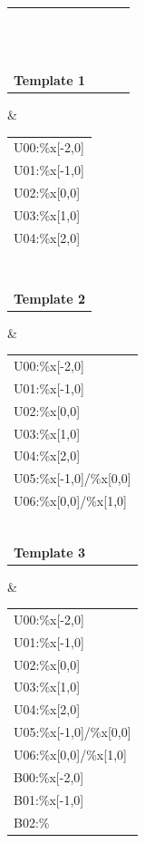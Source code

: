 \documentclass[a4paper,8pt,oneside]{article}
\begin{document}
			\begin{table}[h]
				\begin{tabular}{llll}
					\begin{tabular}[c]{@{}l@{}}U02:\%x{[}0,0{]}\\ \\ \\ \\ \\ \\ \\ \\ \\ \\ \\ \\ \\ \textbf{Template 1}\end{tabular} & \begin{tabular}[c]{@{}l@{}}U00:\%x{[}-2,0{]}\\ U01:\%x{[}-1,0{]}\\ U02:\%x{[}0,0{]}\\ U03:\%x{[}1,0{]}\\ U04:\%x{[}2,0{]}\\ \\ \\ \\ \\ \\ \\ \\ \\ \textbf{Template 2}\end{tabular} & \begin{tabular}[c]{@{}l@{}}U00:\%x{[}-2,0{]}\\ U01:\%x{[}-1,0{]}\\ U02:\%x{[}0,0{]}\\ U03:\%x{[}1,0{]}\\ U04:\%x{[}2,0{]}\\ U05:\%x{[}-1,0{]}/\%x{[}0,0{]}\\ U06:\%x{[}0,0{]}/\%x{[}1,0{]}\\ \\ \\ \\ \\        \\ \\ \textbf{Template 3}\end{tabular} & \begin{tabular}[c]{@{}l@{}}U00:\%x{[}-2,0{]}\\ U01:\%x{[}-1,0{]}\\ U02:\%x{[}0,0{]}\\ U03:\%x{[}1,0{]}\\ U04:\%x{[}2,0{]}\\ U05:\%x{[}-1,0{]}/\%x{[}0,0{]}\\ U06:\%x{[}0,0{]}/\%x{[}1,0{]}\\ B00:\%x{[}-2,0{]}\\ B01:\%x{[}-1,0{]}\\ B02:\%
\end{tabular}
\end{table}
\end{document}
